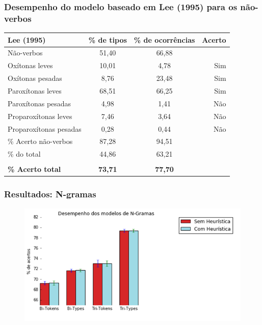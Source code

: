 \documentclass[xcolor=table]{beamer}
\begin{document}
	\begin{frame}
		\frametitle{Desempenho do modelo baseado em Lee (1995) para os não-verbos}
		\begin{table}[H]
			\centering
			\label{TAB29}
			\begin{tabular}{@{}lccr@{}}
				\toprule
				\textbf{Lee (1995)}            &\textbf{ \% de tipos}   & \textbf{\% de ocorrências} & \textbf{Acerto} \\ \midrule
			Não-verbos            & 51,40       & 66,88           &        \\
			\rowcolor[HTML]{656565} 
			Oxítonas leves                & 10,01       & 4,78            & Sim      \\
			\rowcolor[HTML]{656565} 
			Oxítonas pesadas                & 8,76        & 23,48           & Sim      \\
			\rowcolor[HTML]{656565} 
			Paroxítonas leves               & 68,51       & 66,25           & Sim      \\
			Paroxítonas pesadas               & 4,98        & 1,41            & Não      \\
			Proparoxítonas leves                & 7,46        & 3,64            & Não      \\
			Proparoxítonas pesadas                & 0,28        & 0,44            & Não      \\
			\% Acerto não-verbos         & 87,28       & 94,51           &        \\
			\% do total           & 44,86       & 63,21           &        \\
			&               &                   &        \\
			{\bf \% Acerto total} & {\bf 73,71} & {\bf 77,70}     & {\bf } \\ \bottomrule
				\end{tabular}
			\end{table}
	\end{frame}
	
	\begin{frame}
		\frametitle{Resultados: N-gramas}
		\begin{figure}
\centering
\includegraphics[width=0.7\linewidth]{graf-ngramas1}
\label{fig:graf-ngramas1}
\end{figure}

	\end{frame}
\end{document}
